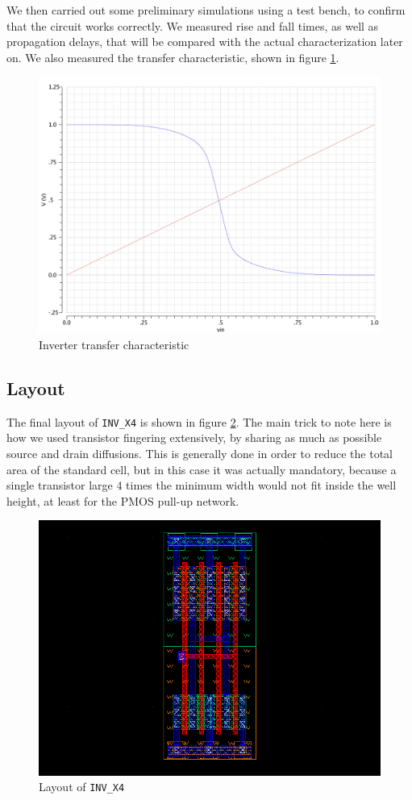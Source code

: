 \documentclass[a4paper]{article}
\newcommand{\inv}{\texttt{INV\_X4}\xspace}
\begin{document}
We then carried out some preliminary simulations using a test bench, to confirm that the circuit works correctly. We measured rise and fall times, as well as propagation delays, that will be compared with the actual characterization later on. We also measured the transfer characteristic, shown in figure \ref{fig:inv_tchar}.
\begin{figure}[H]
	\centering
	\includegraphics[width=.7\linewidth]{../INV_X4/INV_X4_transfer_char.pdf}
	\caption{Inverter transfer characteristic}
	\label{fig:inv_tchar}
\end{figure}

\subsection{Layout}
The final layout of \inv is shown in figure \ref{fig:inv_layout}. The main trick to note here is how we used transistor fingering extensively, by sharing as much as possible source and drain diffusions. This is generally done in order to reduce the total area of the standard cell, but in this case it was actually mandatory, because a single transistor large 4 times the minimum width would not fit inside the well height, at least for the PMOS pull-up network.
\begin{figure}[H]
	\centering
	\includegraphics[width=\linewidth]{../INV_X4/INV_X4_layout.png}
	\caption{Layout of \inv}
	\label{fig:inv_layout}
\end{figure}
\end{document}
